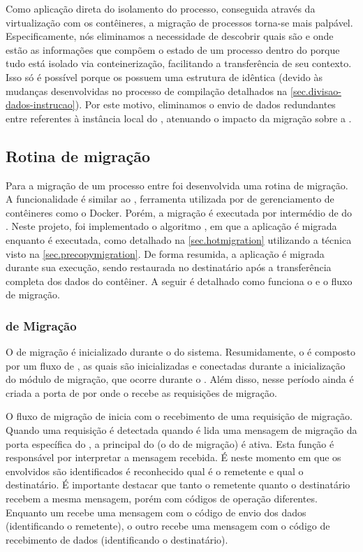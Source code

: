 Como aplicação direta do isolamento do processo, conseguida através da virtualização com os contêineres, a migração de processos torna-se mais palpável. Especificamente, nós eliminamos a necessidade de descobrir quais são e onde estão as informações que compõem o estado de um processo dentro do \nanvix porque tudo está isolado via conteinerização, facilitando a transferência de seu contexto. Isso só é possível porque os \clusters possuem uma estrutura de  idêntica (devido às mudanças desenvolvidas no processo de compilação detalhados na \autoref{sec.divisao-dados-instrucao}). Por este motivo, eliminamos o envio de dados redundantes entre \clusters referentes à instância local do \os, atenuando o impacto da migração sobre a \noc.

\subsection{Rotina de migração}
\label{sec.rotina-migracao}

Para a migração de um processo entre \clusters foi desenvolvida uma rotina de migração. A funcionalidade é similar ao \criu, ferramenta utilizada por \softwares de gerenciamento de contêineres como o Docker. Porém, a migração é executada por intermédio de \daemons do \os. Neste projeto, foi implementado o algoritmo \hotmigration, em que a aplicação é migrada enquanto é executada, como detalhado na \autoref{sec.hotmigration} utilizando a técnica \precopy visto na \autoref{sec.precopymigration}. De forma resumida, a aplicação é migrada durante sua execução, sendo restaurada no \cluster destinatário após a transferência completa dos dados do contêiner. A seguir é detalhado como funciona o \daemon e o fluxo de migração.

\subsubsection{\Daemon de Migração}

O \daemon de migração é inicializado durante o \boot do sistema. Resumidamente, o \daemon é composto por um fluxo de \tasks, as quais são inicializadas e conectadas durante a inicialização do módulo de migração, que ocorre durante o \boot. Além disso, nesse período ainda é criada a porta de \mailbox por onde o \daemon recebe as requisições de migração.
    
O fluxo de migração de inicia com o recebimento de uma requisição de migração. Quando uma requisição é detectada \ie quando é lida uma mensagem de migração da porta específica do \daemon, a \task principal do \daemon (o \handler do \daemon de migração) é ativa. Esta função é responsável por interpretar a mensagem recebida. É neste momento em que os \clusters envolvidos são identificados \ie é reconhecido qual é o \cluster remetente e qual o \cluster destinatário. É importante destacar que tanto o \cluster remetente quanto o destinatário recebem a mesma mensagem, porém com códigos de operação diferentes. Enquanto um recebe uma mensagem com o código de envio dos dados (identificando o remetente), o outro recebe uma mensagem com o código de recebimento de dados (identificando o destinatário).

